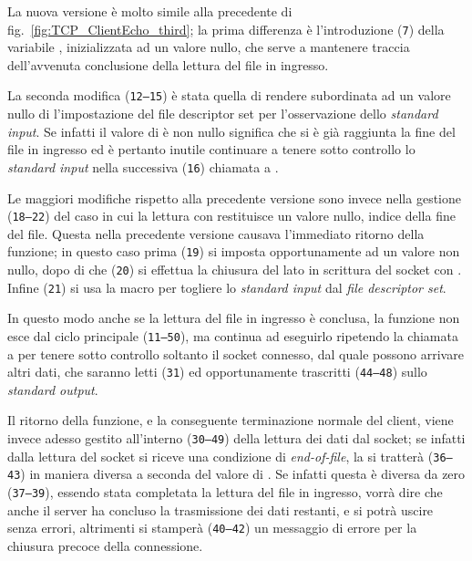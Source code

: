 La nuova versione è molto simile alla precedente di
fig.~\ref{fig:TCP_ClientEcho_third}; la prima differenza è l'introduzione
(\texttt{\small 7}) della variabile , inizializzata ad un valore
nullo, che serve a mantenere traccia dell'avvenuta conclusione della lettura
del file in ingresso.

La seconda modifica (\texttt{\small 12--15}) è stata quella di rendere
subordinata ad un valore nullo di  l'impostazione del file descriptor
set per l'osservazione dello \textit{standard input}. Se infatti il valore di
 è non nullo significa che si è già raggiunta la fine del file in
ingresso ed è pertanto inutile continuare a tenere sotto controllo lo
\textit{standard input} nella successiva (\texttt{\small 16}) chiamata a
.

Le maggiori modifiche rispetto alla precedente versione sono invece nella
gestione (\texttt{\small 18--22}) del caso in cui la lettura con 
restituisce un valore nullo, indice della fine del file. Questa nella
precedente versione causava l'immediato ritorno della funzione; in questo caso
prima (\texttt{\small 19}) si imposta opportunamente  ad un valore
non nullo, dopo di che (\texttt{\small 20}) si effettua la chiusura del lato
in scrittura del socket con . Infine (\texttt{\small 21}) si
usa la macro  per togliere lo \textit{standard input} dal
\textit{file descriptor set}.

In questo modo anche se la lettura del file in ingresso è conclusa, la
funzione non esce dal ciclo principale (\texttt{\small 11--50}), ma continua
ad eseguirlo ripetendo la chiamata a  per tenere sotto controllo
soltanto il socket connesso, dal quale possono arrivare altri dati, che
saranno letti (\texttt{\small 31}) ed opportunamente trascritti
(\texttt{\small 44--48}) sullo \textit{standard output}.

Il ritorno della funzione, e la conseguente terminazione normale del client,
viene invece adesso gestito all'interno (\texttt{\small 30--49}) della lettura
dei dati dal socket; se infatti dalla lettura del socket si riceve una
condizione di \textit{end-of-file}, la si tratterà (\texttt{\small 36--43}) in
maniera diversa a seconda del valore di . Se infatti questa è diversa
da zero (\texttt{\small 37--39}), essendo stata completata la lettura del file
in ingresso, vorrà dire che anche il server ha concluso la trasmissione dei
dati restanti, e si potrà uscire senza errori, altrimenti si stamperà
(\texttt{\small 40--42}) un messaggio di errore per la chiusura precoce della
connessione.


